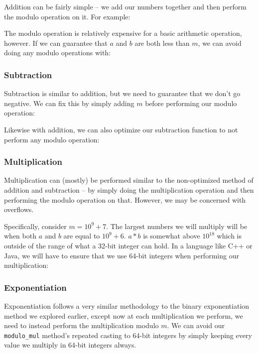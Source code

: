 Addition can be fairly simple -- we add our numbers together and then perform the modulo operation on it. For example:


The modulo operation is relatively expensive for a basic arithmetic operation, however. If we can guarantee that $a$ and $b$ are both less than $m$, we can avoid doing any modulo operations with:


\subsubsection{Subtraction}

Subtraction is similar to addition, but we need to guarantee that we don't go negative. We can fix this by simply adding $m$ before performing our modulo operation:


Likewise with addition, we can also optimize our subtraction function to not perform any modulo operation:


\subsubsection{Multiplication}

Multiplication can (mostly) be performed similar to the non-optimized method of addition and subtraction -- by simply doing the multiplication operation and then performing the modulo operation on that. However, we may be concerned with overflows.

Specifically, consider $m = 10^9 + 7$. The largest numbers we will multiply will be when both $a$ and $b$ are equal to $10^9 + 6$. $a * b$ is somewhat above $10^{18}$ which is outside of the range of what a 32-bit integer can hold. In a language like C++ or Java, we will have to ensure that we use 64-bit integers when performing our multiplication:


\subsubsection{Exponentiation}

Exponentiation follows a very similar methodology to the binary exponentiation method we explored earlier, except now at each multiplication we perform, we need to instead perform the multiplication modulo $m$. We can avoid our \texttt{modulo_mul} method's repeated casting to 64-bit integers by simply keeping every value we multiply in 64-bit integers always.

